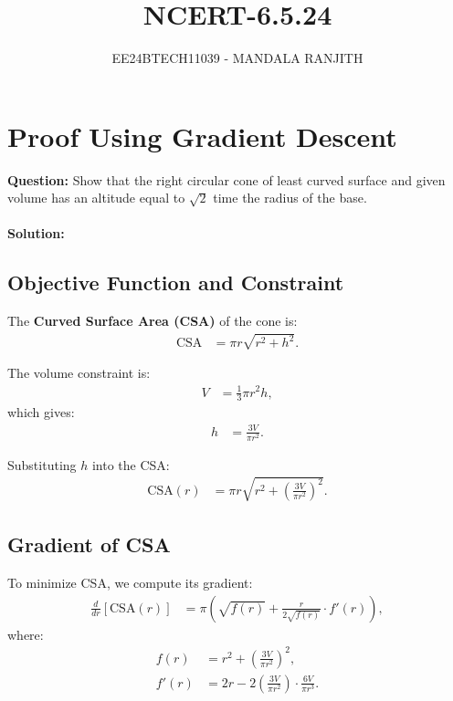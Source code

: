 \documentclass[article]{IEEEtran}
\numberwithin{figure}{enumi}
\begin{document}

\title{NCERT-6.5.24}
\author{EE24BTECH11039 - MANDALA RANJITH}
{\let\newpage\relax\maketitle}

\section*{Proof Using Gradient Descent}
\noindent\textbf{Question: }  
Show that the right circular cone of least curved surface and given volume has an altitude equal to $\sqrt{2}$ time the radius of the base.\\ \\
\noindent\textbf{Solution: } 



\subsection*{Objective Function and Constraint}

The \textbf{Curved Surface Area (CSA)} of the cone is:
\begin{align}
\text{CSA} &= \pi r \sqrt{r^2 + h^2}.
\end{align}

The volume constraint is:
\begin{align}
V &= \frac{1}{3} \pi r^2 h,
\end{align}
which gives:
\begin{align}
h &= \frac{3V}{\pi r^2}.
\end{align}

Substituting \(h\) into the CSA:
\begin{align}
\text{CSA}(r) &= \pi r \sqrt{r^2 + \left(\frac{3V}{\pi r^2}\right)^2}.
\end{align}

\subsection*{Gradient of CSA}

To minimize CSA, we compute its gradient:
\begin{align}
\frac{d}{dr}[\text{CSA}(r)] &= \pi \left(\sqrt{f(r)} + \frac{r}{2\sqrt{f(r)}} \cdot f'(r)\right),
\end{align}
where:
\begin{align}
f(r) &= r^2 + \left(\frac{3V}{\pi r^2}\right)^2, \\
f'(r) &= 2r - 2\left(\frac{3V}{\pi r^2}\right) \cdot \frac{6V}{\pi r^3}.
\end{align}
\end{document}
